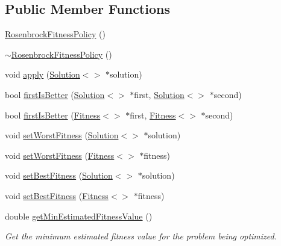 \subsection*{Public Member Functions}
\begin{DoxyCompactItemize}
\item 
\hyperlink{classRosenbrockFitnessPolicy_a1991b0019dc80f465c4034c00149fc8d}{Rosenbrock\+Fitness\+Policy} ()
\item 
\hyperlink{classRosenbrockFitnessPolicy_aaabda48891e8fb971d24d84a8dc5da31}{$\sim$\+Rosenbrock\+Fitness\+Policy} ()
\item 
void \hyperlink{classRosenbrockFitnessPolicy_af93be349121f72b580d64243d2daf5f2}{apply} (\hyperlink{classSolution}{Solution}$<$$>$ $\ast$solution)
\item 
bool \hyperlink{classRosenbrockFitnessPolicy_adfbf6f67e41f0a5a90b8e31245d9b2c9}{first\+Is\+Better} (\hyperlink{classSolution}{Solution}$<$$>$ $\ast$first, \hyperlink{classSolution}{Solution}$<$$>$ $\ast$second)
\item 
bool \hyperlink{classRosenbrockFitnessPolicy_ab5b19517a7d249ddfbc06f9045341014}{first\+Is\+Better} (\hyperlink{structFitness}{Fitness}$<$$>$ $\ast$first, \hyperlink{structFitness}{Fitness}$<$$>$ $\ast$second)
\item 
void \hyperlink{classRosenbrockFitnessPolicy_a99011107bbcaadee1cba44a0c8646bd0}{set\+Worst\+Fitness} (\hyperlink{classSolution}{Solution}$<$$>$ $\ast$solution)
\item 
void \hyperlink{classRosenbrockFitnessPolicy_a36d19eaec4c8e2e7bea72c42cf76bd85}{set\+Worst\+Fitness} (\hyperlink{structFitness}{Fitness}$<$$>$ $\ast$fitness)
\item 
void \hyperlink{classRosenbrockFitnessPolicy_a1ed5f0d7c07f508c1db7cf787e8a9ec2}{set\+Best\+Fitness} (\hyperlink{classSolution}{Solution}$<$$>$ $\ast$solution)
\item 
void \hyperlink{classRosenbrockFitnessPolicy_acb07f61f58234f793fa1323b29203c37}{set\+Best\+Fitness} (\hyperlink{structFitness}{Fitness}$<$$>$ $\ast$fitness)
\item 
double \hyperlink{classRosenbrockFitnessPolicy_af69509049cc555796489d7aecb2afb2f}{get\+Min\+Estimated\+Fitness\+Value} ()
\begin{DoxyCompactList}\small\item\em Get the minimum estimated fitness value for the problem being optimized. \end{DoxyCompactList}\end{DoxyCompactItemize}


